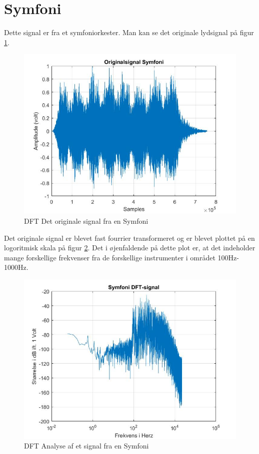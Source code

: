 \section{Symfoni}
Dette signal er fra et symfoniorkester. Man kan se det originale lydsignal på figur \ref{fig:Symfoni original}.
\begin{figure}[H]
	\centering
	\includegraphics[width=140mm]{figures/Symfoni/original.jpg}
	\caption{DFT Det originale signal fra en Symfoni}
	\label{fig:Symfoni original}
\end{figure}

Det originale signal er blevet fast fourrier transformeret og er blevet plottet på en logoritmisk skala på figur \ref{fig:Symfoni DFT}. Det i øjenfaldende på dette plot er, at det indeholder mange forskellige frekvenser fra de forskellige instrumenter i området 100Hz-1000Hz.
\begin{figure}[H]
	\centering
	\includegraphics[width=140mm]{figures/Symfoni/DFT.jpg}
	\caption{DFT Analyse af et signal fra en Symfoni}
	\label{fig:Symfoni DFT}
\end{figure}

